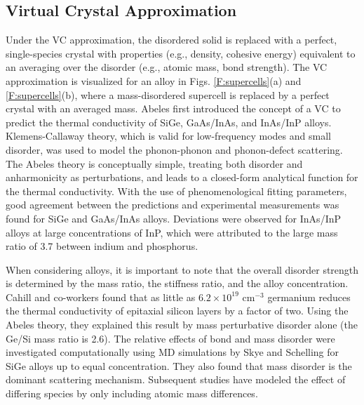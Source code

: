 
\subsection{\label{S:Virtual Crystal}Virtual Crystal Approximation}

Under the VC approximation, the disordered solid is replaced with 
a perfect, single-species crystal with properties (e.g., density, 
cohesive energy) equivalent to an averaging over the disorder 
(e.g., atomic mass, bond strength).\cite{abeles_lattice_1963}
The VC approximation is visualized for an alloy in Figs. 
\ref{F:supercells}(a) and \ref{F:supercells}(b), where 
a mass-disordered supercell is replaced by a perfect 
crystal with an averaged mass. 
Abeles first introduced the concept of a VC to predict the
thermal conductivity of SiGe, GaAs/InAs, and InAs/InP alloys.
\cite{abeles_lattice_1963} Klemens-Callaway theory, 
which is valid for low-frequency modes and small disorder, was used to model 
the phonon-phonon and phonon-defect scattering.
\cite{abeles_lattice_1963,klemens_scattering_1955,klemens_thermal_1957,callaway_model_1959,mattis_phonon_1957,kamitakahara_vibrations_1974} 
The Abeles theory is conceptually simple, treating both
disorder and anharmonicity as perturbations, and leads to 
a closed-form analytical function for the thermal conductivity.
With the use of phenomenological  
fitting parameters, good agreement between the predictions and 
experimental measurements 
was found for SiGe and GaAs/InAs alloys. Deviations were observed 
for InAs/InP alloys at large concentrations of 
InP, which were attributed to the large mass ratio of 3.7 between 
indium and phosphorus.\cite{abeles_lattice_1963}

When considering alloys, it is important to note that 
the overall disorder strength is determined by the mass ratio, 
the stiffness ratio, and the alloy concentration.
Cahill and co-workers found that as little as 
$6.2\times10^{19}$ cm$^{-3}$ germanium reduces the thermal conductivity 
of epitaxial silicon layers by a factor of two.
\cite{cahill_thermal_2004}  
Using the Abeles theory, they explained this result 
by mass perturbative disorder alone (the Ge/Si mass ratio is 2.6).
\cite{cahill_thermal_2004,cahill_thermal_2005} 
The relative effects of bond and mass disorder were investigated 
computationally using MD simulations by Skye and 
Schelling for SiGe alloys up to equal concentration.
\cite{skye_thermal_2008} They also found that mass disorder is 
the dominant scattering mechanism. Subsequent studies have modeled the 
effect of differing species by only including 
atomic mass differences.\cite{landry_thermal_2009,tian_enhancing_2012}

